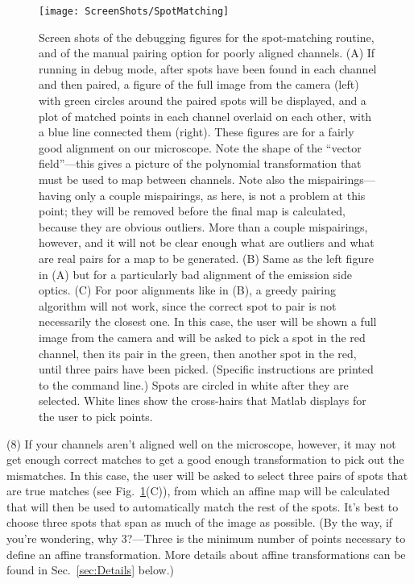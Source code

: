 \documentclass[11pt]{article}
\begin{document}
\begin{figure}
\begin{center}
\texttt{[image: ScreenShots/SpotMatching]}
\caption{Screen shots of the debugging figures for the spot-matching routine, and of the manual pairing option for poorly aligned channels. (A) If running in debug mode, after spots have been found in each channel and then paired, a figure of the full image from the camera (left) with green circles around the paired spots will be displayed, and a plot of matched points in each channel overlaid on each other, with a blue line connected them (right). These figures are for a fairly good alignment on our microscope. Note the shape of the ``vector field''---this gives a picture of the polynomial transformation that must be used to map between channels. Note also the mispairings---having only a couple mispairings, as here, is not a problem at this point; they will be removed before the final map is calculated, because they are obvious outliers.  More than a couple mispairings, however, and it will not be clear enough what are outliers and what are real pairs for a map to be generated. (B) Same as the left figure in (A) but for a particularly bad alignment of the emission side optics. (C) For poor alignments like in (B), a greedy pairing algorithm will not work, since the correct spot to pair is not necessarily the closest one.  In this case, the user will be shown a full image from the camera and will be asked to pick a spot in the red channel, then its pair in the green, then another spot in the red, until three pairs have been picked. (Specific instructions are printed to the command line.)  Spots are circled in white after they are selected.  White lines show the cross-hairs that Matlab displays for the user to pick points.}
\label{fig:PairingShot}
\end{center}
\end{figure}

\noindent (8) If your channels aren't aligned well on the microscope, however, it may not get enough correct matches to get a good enough transformation to pick out the mismatches.  In this case, the user will be asked to select three pairs of spots that are true matches (see Fig.~\ref{fig:PairingShot}(C)), from which an affine map will be calculated that will then be used to automatically match the rest of the spots.  It's best to choose three spots that span as much of the image as possible.  (By the way, if you're wondering, why 3?---Three is the minimum number of points necessary to define an affine transformation.  More details about affine transformations can be found in Sec.~\ref{sec:Details} below.)
\end{document}
